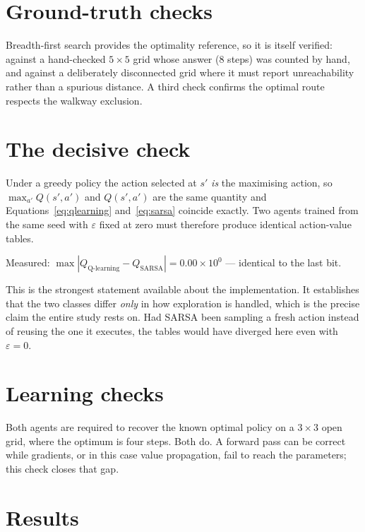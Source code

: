 \section{Ground-truth checks}

Breadth-first search provides the optimality reference, so it is itself verified: against a
hand-checked $5\times5$ grid whose answer (8 steps) was counted by hand, and against a deliberately
disconnected grid where it must report unreachability rather than a spurious distance. A third
check confirms the optimal route respects the walkway exclusion.

\section{The decisive check}


Under a greedy policy the action selected at $s'$ \emph{is} the maximising action, so
$\max_{a'} Q(s',a')$ and $Q(s',a')$ are the same quantity and
Equations~\ref{eq:qlearning} and~\ref{eq:sarsa} coincide exactly. Two agents trained from the same
seed with $\varepsilon$ fixed at zero must therefore produce identical action-value tables.

Measured: $\max |Q_{\text{Q-learning}} - Q_{\text{SARSA}}| = 0.00\times10^{0}$ --- identical to
the last bit.

This is the strongest statement available about the implementation. It establishes that the two
classes differ \emph{only} in how exploration is handled, which is the precise claim the entire
study rests on. Had SARSA been sampling a fresh action instead of reusing the one it executes, the
tables would have diverged here even with $\varepsilon = 0$.

\section{Learning checks}

Both agents are required to recover the known optimal policy on a $3\times3$ open grid, where the
optimum is four steps. Both do. A forward pass can be correct while gradients, or in this case
value propagation, fail to reach the parameters; this check closes that gap.

\section{Results}

